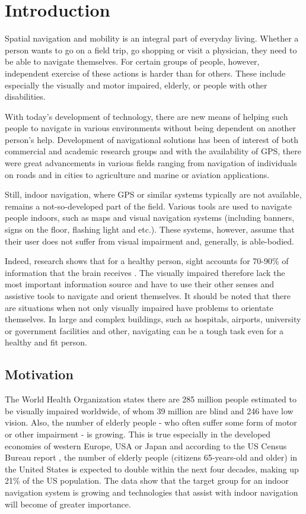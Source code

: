 \chapter{Introduction}
Spatial navigation and mobility is an integral part of everyday living. Whether a person wants to go on a field trip, go shopping or visit a physician, they need to be able to navigate themselves. For certain groups of people, however, independent exercise of these actions is harder than for others. These include especially the visually and motor impaired, elderly, or people with other disabilities.

With today's development of technology, there are new means of helping such people to navigate in various environments without being dependent on another person's help. Development of navigational solutions has been of interest of both commercial and academic research groups and with the availability of GPS, there were great advancements in various fields ranging from navigation of individuals on roads and in cities to agriculture and marine or aviation applications.

Still, indoor navigation, where GPS or similar systems typically are not available, remains a not-so-developed part of the field. Various tools are used to navigate people indoors, such as maps and visual navigation systems (including banners, signs on the floor, flashing light and etc.). These systems, however, assume that their user does not suffer from visual impairment and, generally, is able-bodied.

Indeed, research shows that for a healthy person, sight accounts for 70-90\% of information that the brain receives \cite{hyerle}. The visually impaired therefore lack the most important information source and have to use their other senses and assistive tools to navigate and orient themselves. It should be noted that there are situations when not only visually impaired have problems to orientate themselves. In large and complex buildings, such as hospitals, airports, university or government facilities and other, navigating can be a tough task even for a healthy and fit person. 

\section{Motivation}
The World Health Organization states \cite{who} there are 285 million people estimated to be visually impaired worldwide, of whom 39 million are blind and 246 have low vision. Also, the number of elderly people - who often suffer some form of motor or other impairment - is growing. This is true especially in the developed economies of western Europe, USA or Japan and according to the US Census Bureau report \cite{uscensus}, the number of elderly people (citizens 65-years-old and older) in the United States is expected to double within the next four decades, making up 21\% of the US population. The data show that the target group for an indoor navigation system is growing and technologies that assist with indoor navigation will become of greater importance.\\


